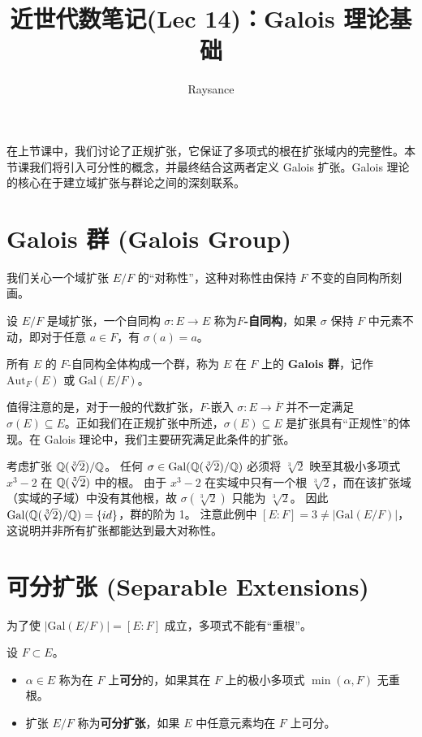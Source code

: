 \documentclass[11pt]{article}
\title{近世代数笔记(Lec 14)：Galois 理论基础}
\author{Raysance}
\date{}
\begin{document}
\maketitle

在上节课中，我们讨论了正规扩张，它保证了多项式的根在扩张域内的完整性。本节课我们将引入可分性的概念，并最终结合这两者定义 Galois 扩张。Galois 理论的核心在于建立域扩张与群论之间的深刻联系。

\section{Galois 群 (Galois Group)}

我们关心一个域扩张 $E/F$ 的“对称性”，这种对称性由保持 $F$ 不变的自同构所刻画。

\begin{cndefinition}
    设 $E/F$ 是域扩张，一个自同构 $\sigma: E \to E$ 称为\textbf{$F$-自同构}，如果 $\sigma$ 保持 $F$ 中元素不动，即对于任意 $a \in F$，有 $\sigma(a) = a$。
    
    所有 $E$ 的 $F$-自同构全体构成一个群，称为 $E$ 在 $F$ 上的 \textbf{Galois 群}，记作 $\text{Aut}_F(E)$ 或 $\text{Gal}(E/F)$。
    
    值得注意的是，对于一般的代数扩张，$F$-嵌入 $\sigma: E \to \overline{F}$ 并不一定满足 $\sigma(E) \subseteq E$。正如我们在正规扩张中所述，$\sigma(E) \subseteq E$ 是扩张具有“正规性”的体现。在 Galois 理论中，我们主要研究满足此条件的扩张。
\end{cndefinition}

\begin{cnexample}
    考虑扩张 $\mathbb{Q}(\sqrt[3]{2})/\mathbb{Q}$。
    任何 $\sigma \in \text{Gal}(\mathbb{Q}(\sqrt[3]{2})/\mathbb{Q})$ 必须将 $\sqrt[3]{2}$ 映至其极小多项式 $x^3-2$ 在 $\mathbb{Q}(\sqrt[3]{2})$ 中的根。
    由于 $x^3-2$ 在实域中只有一个根 $\sqrt[3]{2}$，而在该扩张域（实域的子域）中没有其他根，故 $\sigma(\sqrt[3]{2})$ 只能为 $\sqrt[3]{2}$。
    因此 $\text{Gal}(\mathbb{Q}(\sqrt[3]{2})/\mathbb{Q}) = \{id\}$，群的阶为 1。
    注意此例中 $[E:F] = 3 \neq |\text{Gal}(E/F)|$，这说明并非所有扩张都能达到最大对称性。
\end{cnexample}

\section{可分扩张 (Separable Extensions)}

为了使 $|\text{Gal}(E/F)| = [E:F]$ 成立，多项式不能有“重根”。

\begin{cndefinition}[可分元与可分扩张]
    设 $F \subset E$。
    \begin{itemize}
        \item $\alpha \in E$ 称为在 $F$ 上\textbf{可分}的，如果其在 $F$ 上的极小多项式 $\min(\alpha, F)$ 无重根。
        \item 扩张 $E/F$ 称为\textbf{可分扩张}，如果 $E$ 中任意元素均在 $F$ 上可分。
    \end{itemize}
\end{cndefinition}
\end{document}
